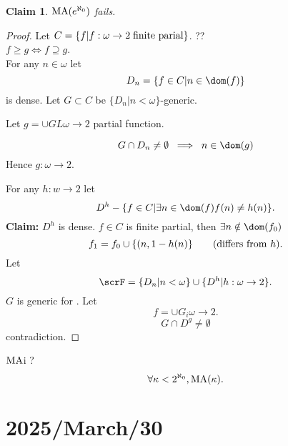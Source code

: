 \documentclass[11pt,pdftex,twoside,a4paper]{article}
\newcommand{\B}[1]{\textbf{#1}}
\newcommand{\MA}{\ensuremath{\mathop{\rm MA}\nolimits}}
\newtheorem{claim}[thm]{Claim}
\begin{document}
\begin{claim}
\(\MA(e^{\aleph_0})\) fails.
\end{claim}
\begin{proof}
Let \(C = \{f| f: \omega \to 2 \;\textnormal{finite parial}\}\). ??
\\
\(f \geq g \iff f \supseteq g\).
\\
For any \(n\in \omega\) let
\begin{equation*}
D_n = \{f\in C| n \in\dom(f)\}
\end{equation*}
is dense.
Let \(G \subset C\)  be  \(\{D_n|n < \omega\}\)-generic.

Let \(g = \cup GL \omega \to 2\) partial function.

\begin{equation*}
 G \cap D_n \neq \emptyset \;\implies\; n \in \dom(g)
\end{equation*}
Hence  \(g:\omega \to 2\).

For any \(h:w\to 2\) let
\begin{equation*}
D^h - \{f\in C| \exists n\in \dom(f) f(n)\neq h(n)\}.
\end{equation*}
\B{Claim:} \(D^h\) is dense.
\(f\in C\) is finite partial, then \(\exists n \notin \dom(f_0)\)
\begin{equation*}
f_1 = f_0 \cup \{(n,1 - h(n)\} \qquad \textnormal{(differs from $h$)}.
\end{equation*}
Let
\begin{equation*}
\scrF = \{D_n | n < \omega\} \cup \{D^h | h : \omega \to 2\}.
\end{equation*}
$G$ is generic for \scrF.
Let
\begin{equation*}
f = \cup G_i \omega \to 2.
\end{equation*}
\begin{equation*}
 G \cap D^g \neq \emptyset
\end{equation*}
contradiction.
\end{proof}

\(\MA\)i ?
\begin{equation*}
\forall \kappa < 2^{\aleph_0}, \MA(\kappa).
\end{equation*}

\section{2025/March/30}
\end{document}
